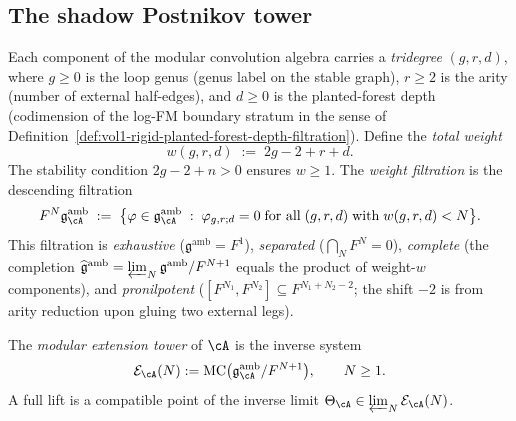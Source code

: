 \subsection{The shadow Postnikov tower}
\label{subsec:shadow-postnikov-tower}

\begin{definition}
\label{def:weight-filtration-tower}
Each component of the modular convolution algebra carries a
\emph{tridegree} $(g, r, d)$, where
$g \geq 0$ is the loop genus (genus label on the stable graph),
$r \geq 2$ is the arity (number of external half-edges), and
$d \geq 0$ is the planted-forest depth (codimension of the
log-FM boundary stratum in the sense of
Definition~\ref{def:vol1-rigid-planted-forest-depth-filtration}).
Define the \emph{total weight}
\[
w(g, r, d) \;:=\; 2g - 2 + r + d.
\]
The stability condition $2g - 2 + n > 0$ ensures $w \geq 1$.
The \emph{weight filtration} is the descending filtration
\[
F^N\mathfrak{g}^{\mathrm{amb}}_{\cA}
\;:=\;
\bigl\{\varphi \in \mathfrak{g}^{\mathrm{amb}}_{\cA}
\;:\; \varphi_{g,r;d} = 0 \;\text{for all}\;
(g,r,d) \;\text{with}\; w(g,r,d) < N\bigr\}.
\]
This filtration is \emph{exhaustive}
($\mathfrak{g}^{\mathrm{amb}} = F^1$),
\emph{separated}
($\bigcap_{N} F^N = 0$),
\emph{complete} (the completion
$\widehat{\mathfrak{g}}^{\mathrm{amb}}
= \varprojlim_N \mathfrak{g}^{\mathrm{amb}}/F^{N+1}$
equals the product of weight-$w$ components), and
\emph{pronilpotent}
($[F^{N_1}, F^{N_2}] \subseteq F^{N_1 + N_2 - 2}$;
the shift $-2$ is from arity reduction upon gluing two
external legs).
\end{definition}

\begin{definition}
\label{def:extension-tower}
The \emph{modular extension tower} of $\cA$ is the inverse system
\begin{equation}
\label{eq:extension-tower}
\mathcal{E}_{\cA}(N)
:=
\operatorname{MC}\bigl(
\mathfrak{g}^{\mathrm{amb}}_{\cA}/F^{N+1}
\bigr),
\qquad N \geq 1.
\end{equation}
A full lift is a compatible point of the inverse limit
$\Theta_{\cA} \in \varprojlim_N \mathcal{E}_{\cA}(N)$.
\end{definition}

